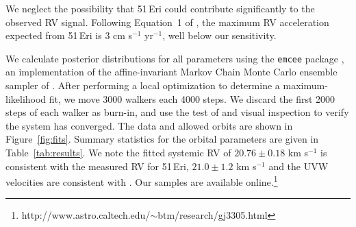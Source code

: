 We neglect the possibility that 51\,Eri could contribute significantly to the observed RV signal. 
Following Equation~1 of \citet{Montet15a}, 
the maximum RV acceleration expected from 51\,Eri is 3 cm s$^{-1}$ yr$^{-1}$,
well below our sensitivity.



We calculate posterior distributions for all parameters using the
\texttt{emcee} package \citep{Foreman-Mackey12}, an implementation of the
affine-invariant Markov Chain Monte Carlo ensemble sampler of \citet{Goodman10}.
After performing a local optimization to determine a maximum-likelihood fit, 
we move 3000 walkers each 4000 steps.
We discard the first 2000 steps of each walker as burn-in, and use the test of
\citet{Geweke92} and visual inspection to verify the 
system has converged.
The data and allowed orbits are shown in Figure~\ref{fig:fits}.
Summary statistics for the orbital parameters are given in
Table~\ref{tab:results}.
We note the fitted systemic RV of $20.76 \pm 0.18$ km s$^{-1}$ is consistent with the 
measured RV for 
51\,Eri, $21.0 \pm 1.2$ km s$^{-1}$ \citep{Bobylev06} and the UVW velocities
are consistent with \citet{Mamajek14}.
Our samples are available 
online.\footnote{http://www.astro.caltech.edu/$\sim$btm/research/gj3305.html}

